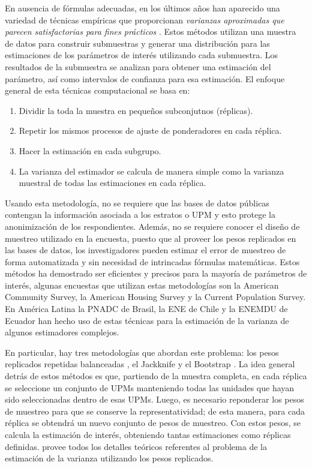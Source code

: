 \documentclass[
  12pt,
]{book}
\providecommand{\tightlist}{%
  \setlength{\itemsep}{0pt}\setlength{\parskip}{0pt}}
\begin{document}
En ausencia de fórmulas adecuadas, en los últimos años han aparecido una variedad de técnicas empíricas que proporcionan \emph{varianzas aproximadas que parecen satisfactorias para fines prácticos} \citep{Kish_1965}. Estos métodos utilizan una muestra de datos para construir submuestras y generar una distribución para las estimaciones de los parámetros de interés utilizando cada submuestra. Los resultados de la submuestra se analizan para obtener una estimación del parámetro, así como intervalos de confianza para esa estimación. El enfoque general de esta técnicas computacional se basa en:

\begin{enumerate}
\def\labelenumi{\arabic{enumi}.}
\tightlist
\item
  Dividir la toda la muestra en pequeños subconjutnos (réplicas).
\item
  Repetir los mismos procesos de ajuste de ponderadores en cada réplica.
\item
  Hacer la estimación en cada subgrupo.
\item
  La varianza del estimador se calcula de manera simple como la varianza muestral de todas las estimaciones en cada réplica.
\end{enumerate}

Usando esta metodología, no se requiere que las bases de datos públicas contengan la información asociada a los estratos o UPM y esto protege la anonimización de los respondientes. Además, no se requiere conocer el diseño de muestreo utilizado en la encuesta, puesto que al proveer los pesos replicados en las bases de datos, los investigadores pueden estimar el error de muestreo de forma automatizada y sin necesidad de intrincadas fórmulas matemáticas. Estos métodos ha demostrado ser eficientes y precisos para la mayoría de parámetros de interés, algunas encuestas que utilizan estas metodologías son la American Community Survey, la American Housing Survey y la Current Population Survey. En América Latina la PNADC de Brasil, la ENE de Chile y la ENEMDU de Ecuador han hecho uso de estas técnicas para la estimación de la varianza de algunos estimadores complejos.

En particular, hay tres metodologías que abordan este problema: los pesos replicados repetidas balanceadas \citep{McCarthy_1969, Judkins_1990}, el Jackknife \citep{Krewski_Rao_1981} y el Bootstrap \citep{Rao_Wu_1988}. La idea general detrás de estos métodos es que, partiendo de la muestra completa, en cada réplica se seleccione un conjunto de UPMs manteniendo todas las unidades que hayan sido seleccionadas dentro de esas UPMs. Luego, es necesario reponderar los pesos de muestreo para que se conserve la representatividad; de esta manera, para cada réplica se obtendrá un nuevo conjunto de pesos de muestreo. Con estos pesos, se calcula la estimación de interés, obteniendo tantas estimaciones como réplicas definidas. \citet{Wolter_2007} provee todos los detalles teóricos referentes al problema de la estimación de la varianza utilizando los pesos replicados.
\end{document}
